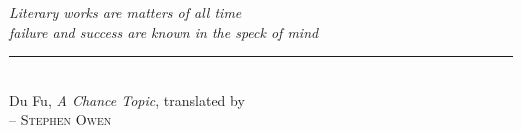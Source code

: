\begin{center}                      %
\vspace*{1.25in}                     %
\begin{onehalfspacing}
    \textit{
    Literary works are matters of all time\\
    failure and success are known in the speck of mind
    } \\
    
    \rule{1.5in}{0.5pt} \\          %
    
    \vspace{0.2cm}Du Fu, \textit{A Chance Topic}, translated by\\
    \vspace{-0.15cm}\textsc{-- Stephen Owen}
\end{onehalfspacing}
\end{center}
